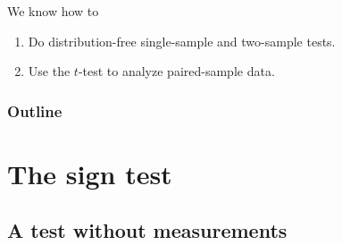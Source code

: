 %
%
%



\subtitle{and the Wilcoxon signed-rank test}

\date{31 March 2015}



\begin{frame}
  \maketitle
\end{frame}


\begin{frame}{We know how to}
  \begin{enumerate}
    \item Do distribution-free single-sample and two-sample tests.
    \item Use the $t$-test to analyze paired-sample data.
  \end{enumerate}
\end{frame}

\begin{frame}\frametitle<presentation>{Outline}
  \tableofcontents
\end{frame}


\section{The sign test}

\subsection{A test without measurements}

